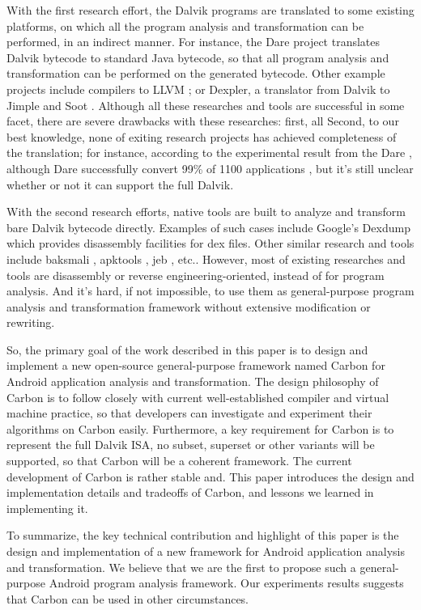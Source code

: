 \documentclass[preprint, cm]{sigplanconf}
\begin{document}
With the first research effort, the Dalvik programs are translated
to some existing platforms, on which all the program
analysis and transformation can be performed, in an indirect manner.
For instance, the Dare project \cite{dare2012} translates Dalvik
bytecode to standard Java bytecode, so that all program
analysis and transformation can be performed on the
generated bytecode. Other example projects include
compilers to LLVM \cite{}; or Dexpler, a translator from Dalvik
to Jimple and 
Soot \cite{}. Although all these researches and tools are successful
in some facet, there are severe drawbacks with these researches: first, all
Second, to our best knowledge, none of exiting research projects
has achieved completeness of the translation; for instance, according
to the experimental result from the Dare \cite{dare2012}, although
Dare successfully convert 99\% of 1100 applications
, but it's still unclear whether or not it can support the full Dalvik.

With the second research efforts, native tools are built to
analyze and transform bare Dalvik bytecode directly. Examples of
such cases include Google's
Dexdump which provides disassembly facilities for dex files. Other
similar research and tools 
include baksmali \cite{}, apktools \cite{}, jeb \cite{}, etc.. However, most of
existing researches and tools are disassembly or reverse engineering-oriented, 
instead of for program analysis. And it's hard, if not
impossible, to use them as general-purpose
program analysis and transformation framework without extensive
modification or rewriting.

So, the primary goal of the work described in this paper is to design
and implement a new open-source general-purpose framework named
Carbon for
Android application analysis and transformation. The design philosophy
of Carbon is to follow closely with current well-established
compiler and virtual
machine practice, so that developers can investigate and experiment
their algorithms on Carbon easily. Furthermore, a key requirement
for Carbon is to
represent the full Dalvik ISA, no subset, superset or other
variants will be supported, so that Carbon will be a coherent
framework. The current development of Carbon is rather 
stable and. This paper introduces the design and implementation
details and tradeoffs of Carbon, and lessons we learned in implementing it.

To summarize, the key technical contribution and highlight
of this paper is the design and implementation of a new
framework for Android application analysis and transformation. We
believe that we are the first to propose such a general-purpose
Android program analysis framework. Our experiments results
suggests that Carbon can be used in other circumstances.
\end{document}

